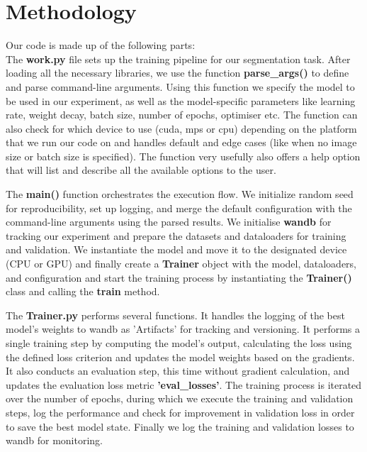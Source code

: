 \section{Methodology}

Our code is made up of the following parts: \\
The \textbf{work.py} file sets up the training pipeline for our segmentation task. After loading all the necessary libraries, we use the function \textbf{parse\_args()} to define and parse command-line arguments. Using this function  we specify the model to be used in our experiment, as well as the model-specific parameters like learning rate, weight decay, batch size, number of epochs, optimiser etc. The function can also check for which device to use (cuda, mps or cpu) depending on the platform that we run our code on and handles default and edge cases (like when no image size or batch size is specified). The function very usefully also offers a help option that will list and describe all the available options to the user. 

The \textbf{main()} function orchestrates the execution flow. We initialize random seed for reproducibility, set up logging, and merge the default configuration with the command-line arguments using the parsed results. We initialise \textbf{wandb} for tracking our experiment and prepare the datasets and dataloaders for training and validation. We instantiate the model and move it to the designated device (CPU or GPU) and finally create a \textbf{Trainer} object with the model, dataloaders, and configuration and start the training process by instantiating the \textbf{Trainer()} class and calling the \textbf{train} method. 

The \textbf{Trainer.py} performs several functions. It handles the logging of the best model's weights to wandb as 'Artifacts' for tracking and versioning. It performs a single training step by computing the model's output, calculating the loss using the defined loss criterion and updates the model weights based on the gradients. It also conducts an evaluation step, this time without gradient calculation, and updates the evaluation loss metric \textbf{'eval\_losses'}. The training process is iterated over the number of epochs, during which we execute the training and validation steps, log the performance and check for improvement in validation loss in order to save the best model state. Finally we log the training and validation losses to wandb for monitoring. 

